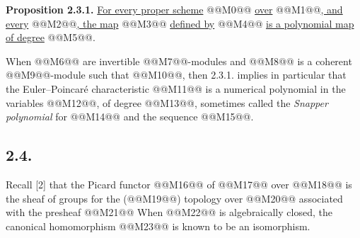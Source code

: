
\textbf{Proposition 2.3.1.} \uline{For every proper scheme} @@M0@@ \uline{over} @@M1@@\uline{, and every} @@M2@@\uline{, the map}
@@M3@@
\uline{defined by}
@@M4@@
\uline{is a polynomial map of degree} @@M5@@.

When @@M6@@ are invertible @@M7@@-modules and @@M8@@ is a coherent @@M9@@-module such that @@M10@@, then 2.3.1. implies in particular that the Euler--Poincaré characteristic
@@M11@@
is a numerical polynomial in the variables @@M12@@, of degree @@M13@@, sometimes called the \emph{Snapper polynomial} for @@M14@@ and the sequence @@M15@@.

\subsection*{2.4.}
Recall [2] that the Picard functor @@M16@@ of @@M17@@ over @@M18@@ is the sheaf of groups for the (@@M19@@) topology over @@M20@@ associated with the presheaf
@@M21@@
When @@M22@@ is algebraically closed, the canonical homomorphism
@@M23@@
is known to be an isomorphism.

\providecommand{\Filt}{\operatorname{Fil}}
\providecommand{\fpqc}{\mathrm{fpqc}}
\providecommand{\Sch}{\operatorname{Sch}}
\renewcommand{\Ob}{\operatorname{ob}}
\providecommand{\Gm}{\mathbb G_m}
\providecommand{\Der}{\operatorname{Der}}
\providecommand{\SL}{\operatorname{SL}}
\providecommand{\Aut}{\operatorname{Aut}}
\providecommand{\Mod}{\operatorname{Mod}}
\providecommand{\Tors}{\operatorname{Tors}}
\providecommand{\Mat}{\operatorname{Mat}}
\providecommand{\len}{\operatorname{long}}
\renewcommand{\id}{\operatorname{id}}
\providecommand{\Spec}{\operatorname{Spec}}
\providecommand{\Picf}{\operatorname{Pic}}
\providecommand{\Ens}{\operatorname{Ens}}
\providecommand{\clp}{\operatorname{cl}_{P}}
\providecommand{\clo}{\operatorname{cl}^{\circ}}
\providecommand{\clb}{\operatorname{cl}_{\bullet}}
\providecommand{\Grb}{\operatorname{Gr}_{\bullet}}
\providecommand{\Gro}{\operatorname{Gr}^{\bullet}}
\providecommand{\longO}[1]
{\operatorname{length}_{#1}}

\renewcommand{\Gro}{\operatorname{Gr}^{\bullet}}
